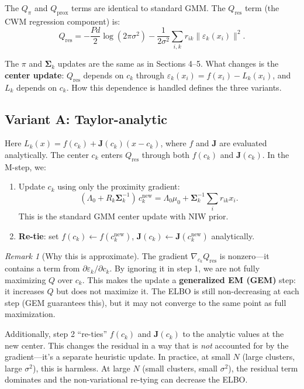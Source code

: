 \documentclass[11pt]{article}
\theoremstyle{definition}
\theoremstyle{plain}
\theoremstyle{remark}
\newtheorem{remark}{Remark}[section]
\newcommand{\Sv}{\boldsymbol{\Sigma}}
\newcommand{\Jv}{\boldsymbol{J}}
\begin{document}
The $Q_\pi$ and $Q_{\text{prox}}$ terms are identical to standard GMM. The $Q_{\text{res}}$ term (the CWM regression component) is:
\begin{equation}
  Q_{\text{res}} = -\frac{Pd}{2}\log(2\pi\sigma^2) - \frac{1}{2\sigma^2}\sum_{i,k} r_{ik}\|\varepsilon_k(x_i)\|^2.
\end{equation}

The $\pi$ and $\Sv_k$ updates are the same as in Sections 4--5. What changes is the \textbf{center update}: $Q_{\text{res}}$ depends on $c_k$ through $\varepsilon_k(x_i)=f(x_i)-L_k(x_i)$, and $L_k$ depends on $c_k$. How this dependence is handled defines the three variants.

\subsection{Variant A: Taylor-analytic}

Here $L_k(x)=f(c_k)+\Jv(c_k)(x-c_k)$, where $f$ and $\Jv$ are evaluated analytically. The center $c_k$ enters $Q_{\text{res}}$ through both $f(c_k)$ and $\Jv(c_k)$. In the M-step, we:

\begin{enumerate}[leftmargin=*,itemsep=2pt]
  \item Update $c_k$ using only the proximity gradient:
  \begin{equation}
    (\Lambda_0+R_k\Sv_k^{-1})\,c_k^{\mathrm{new}} = \Lambda_0\mu_0 + \Sv_k^{-1}\sum_i r_{ik}x_i.
    \label{eq:ck-prox-only}
  \end{equation}
  This is the standard GMM center update with NIW prior.

  \item \textbf{Re-tie}: set $f(c_k)\gets f(c_k^{\mathrm{new}})$, $\Jv(c_k)\gets\Jv(c_k^{\mathrm{new}})$ analytically.
\end{enumerate}

\begin{remark}[Why this is approximate]
The gradient $\nabla_{c_k}Q_{\text{res}}$ is nonzero---it contains a term from $\partial\varepsilon_k/\partial c_k$. By ignoring it in step 1, we are not fully maximizing $Q$ over $c_k$. This makes the update a \textbf{generalized EM (GEM)} step: it increases $Q$ but does not maximize it. The ELBO is still non-decreasing at each step (GEM guarantees this), but it may not converge to the same point as full maximization.

Additionally, step 2 ``re-ties'' $f(c_k)$ and $\Jv(c_k)$ to the analytic values at the new center. This changes the residual in a way that is \emph{not} accounted for by the gradient---it's a separate heuristic update. In practice, at small $N$ (large clusters, large $\sigma^2$), this is harmless. At large $N$ (small clusters, small $\sigma^2$), the residual term dominates and the non-variational re-tying can decrease the ELBO.
\end{remark}
\end{document}
